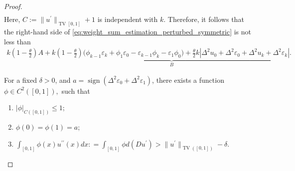 \documentclass[12pt]{amsart}
\numberwithin{equation}{section}
\theoremstyle{remark}
\begin{document}
\begin{proof}
\begin{equation}
\begin{aligned}
    \end{aligned}
\end{equation}
Here, $C := \|{u^\prime}\|_{\operatorname{TV}[0,1]} + 1$ is independent with $k$.
Therefore, it follows that the right-hand side of \eqref{eq:weight_sum_estimation_perturbed_symmetric} is not less than
\begin{equation}
    \begin{aligned}
k(1 - \frac{\theta}{2}) A + \underbrace{k(1-\frac{\theta}{2}) \Big(\phi_{k-1} \varepsilon_k+\phi_1 \varepsilon_0-\varepsilon_{k-1}\phi_k-\varepsilon_1\phi_0 \Big) + \frac \theta 2 k|\Delta^2 u_0+\Delta^2 \varepsilon_0 + \Delta^2 u_k+\Delta^2 \varepsilon_k|.}_B
    \end{aligned}
\end{equation}


For a fixed $\delta > 0$, and $a = \operatorname{sign}(\Delta^2 \varepsilon_0+\Delta^2\varepsilon_1)$,  there exists a function $\phi \in C^2([0,1]),$ such that
\begin{enumerate}
        \item[(a)] $|\phi|_{C([0,1])}\le 1$;
        \item[(b)] $\phi(0) = \phi(1)=a$;
        \item[(c)] $\int_{[0,1]} \phi(x) u^{\prime\prime}(x)dx: = \int_{[0,1]}\phi d(Du^\prime) > \|u^\prime\|_{\operatorname{TV}([0,1])}-\delta.$
    \end{enumerate}


\end{proof}
\end{document}
